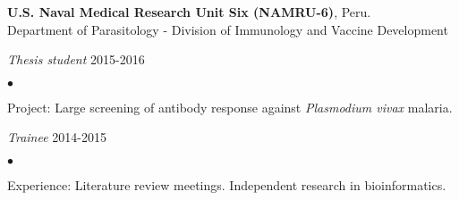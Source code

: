 \documentclass[margin,line]{res}
\newenvironment{list1}{
  \begin{list}{\ding{113}}{%
      \setlength{\itemsep}{0in}
      \setlength{\parsep}{0in} \setlength{\parskip}{0in}
      \setlength{\topsep}{0in} \setlength{\partopsep}{0in}
      \setlength{\leftmargin}{0.17in}}}{\end{list}}
\newenvironment{list2}{
  \begin{list}{$\bullet$}{%
      \setlength{\itemsep}{0in}
      \setlength{\parsep}{0in} \setlength{\parskip}{0in}
      \setlength{\topsep}{0in} \setlength{\partopsep}{0in}
      \setlength{\leftmargin}{0.2in}}}{\end{list}}
\begin{document}
\begin{resume}
{\bf U.S. Naval Medical Research Unit Six (NAMRU-6)}, Peru.\\
Department of Parasitology - Division of Immunology and Vaccine Development\\
\vspace*{-.1in}
\begin{list1}
	\item[] {\em Thesis student} \hfill 2015-2016\\%
	\vspace*{-.1in}
	\begin{list2} %
		\item Project: Large screening of antibody response against \textit{Plasmodium vivax} malaria.\\
	\end{list2}
	\vspace*{-.1in}
	\item[] {\em Trainee} \hfill 2014-2015\\%
	\vspace*{-.1in}
	\begin{list2} %
		\item Experience: Literature review meetings. Independent research in bioinformatics.\\%
	\end{list2}
\end{list1}


\end{resume}
\end{document}
